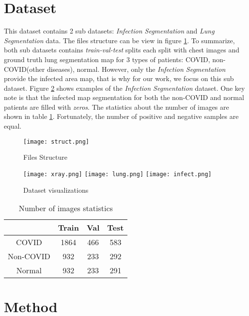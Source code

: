 \documentclass[conference]{IEEEtran}
\begin{document}
\section{Dataset}
This dataset contains 2 sub datasets: \emph{Infection Segmentation} and \emph{Lung Segmentation} data. The files structure can be view in figure \ref{fig:struct}. To summarize, both sub datasets contains \emph{train-val-test} splits each split with chest images and ground truth lung segmentation map for 3 types of patients: COVID, non-COVID(other diseases), normal. However, only the \emph{Infection Segmentation} provide the infected area map, that is why for our work, we focus on this sub dataset. Figure \ref{fig:vis} shows examples of the \emph{Infection Segmentation} dataset. One key note is that the infected map segmentation for both the non-COVID and normal patients are filled with \emph{zeros}. The statistics about the number of images are shown in table \ref{tab:stats}. Fortunately, the number of positive and negative samples are equal.
\begin{figure}
    \centering
    \texttt{[image: struct.png]}
    \caption{Files Structure}
    \label{fig:struct}
\end{figure}

\begin{figure}
    \centering
    \texttt{[image: xray.png]}
    \texttt{[image: lung.png]}
    \texttt{[image: infect.png]}
    \caption{Dataset visualizations}
    \label{fig:vis}
\end{figure}

\begin{table}
\centering
\begin{tabular}{ |c|c|c|c| } 
 \hline
 & Train & Val & Test \\ 
 \hline
 COVID & 1864 & 466 & 583 \\ 
 Non-COVID & 932 & 233 & 292 \\ 
 Normal & 932 & 233 & 291 \\ 
 \hline
\end{tabular}

\caption{Number of images statistics}
\label{tab:stats}
\end{table}

\section{Method}
\end{document}
